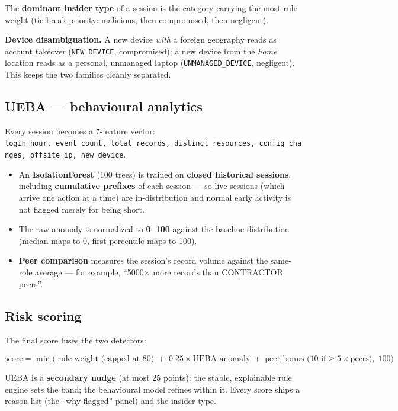 \documentclass[
]{article}
\providecommand{\tightlist}{%
  \setlength{\itemsep}{0pt}\setlength{\parskip}{0pt}}
\begin{document}
The \textbf{dominant insider type} of a session is the category carrying
the most rule weight (tie-break priority: malicious, then compromised,
then negligent).

\textbf{Device disambiguation.} A new device \emph{with} a foreign
geography reads as account takeover (\texttt{NEW\_DEVICE}, compromised);
a new device from the \emph{home} location reads as a personal,
unmanaged laptop (\texttt{UNMANAGED\_DEVICE}, negligent). This keeps the
two families cleanly separated.

\subsection{UEBA --- behavioural
analytics}\label{ueba-behavioural-analytics}

Every session becomes a 7-feature vector:
\texttt{login\_hour,\ event\_count,\ total\_records,\ distinct\_resources,\ config\_changes,\ offsite\_ip,\ new\_device}.

\begin{itemize}
\tightlist
\item
  An \textbf{IsolationForest} (100 trees) is trained on \textbf{closed
  historical sessions}, including \textbf{cumulative prefixes} of each
  session --- so live sessions (which arrive one action at a time) are
  in-distribution and normal early activity is not flagged merely for
  being short.
\item
  The raw anomaly is normalized to \textbf{0--100} against the baseline
  distribution (median maps to 0, first percentile maps to 100).
\item
  \textbf{Peer comparison} measures the session's record volume against
  the same-role average --- for example, ``5000× more records than
  CONTRACTOR peers''.
\end{itemize}

\subsection{Risk scoring}\label{risk-scoring}

The final score fuses the two detectors:

\[\text{score} = \min\!\big(\; \text{rule\_weight (capped at 80)} \;+\; 0.25 \times \text{UEBA\_anomaly} \;+\; \text{peer\_bonus (10 if} \geq 5\times \text{peers)}, \; 100 \big)\]

UEBA is a \textbf{secondary nudge} (at most 25 points): the stable,
explainable rule engine sets the band; the behavioural model refines
within it. Every score ships a reason list (the ``why-flagged'' panel)
and the insider type.
\end{document}

